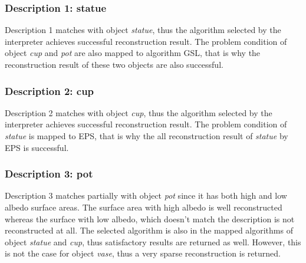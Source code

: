 
\subsubsection{Description 1: statue}
Description 1 matches with object \textit{statue}, thus the algorithm selected by the interpreter achieves successful reconstruction result. The problem condition of object \textit{cup} and \textit{pot} are also mapped to algorithm GSL, that is why the reconstruction result of these two objects are also successful.

\subsubsection{Description 2: cup}
Description 2 matches with object \textit{cup}, thus the algorithm selected by the interpreter achieves successful reconstruction result. The problem condition of \textit{statue} is mapped to EPS, that is why the all reconstruction result of \textit{statue} by EPS is successful.

\subsubsection{Description 3: pot}
Description 3 matches partially with object \textit{pot} since it has both high and low albedo surface areas. The surface area with high albedo is well reconstructed whereas the surface with low albedo, which doesn't match the description is not reconstructed at all. The selected algorithm is also in the mapped algorithms of object \textit{statue} and \textit{cup}, thus satisfactory results are returned as well. However, this is not the case for object \textit{vase}, thus a very sparse reconstruction is returned.

